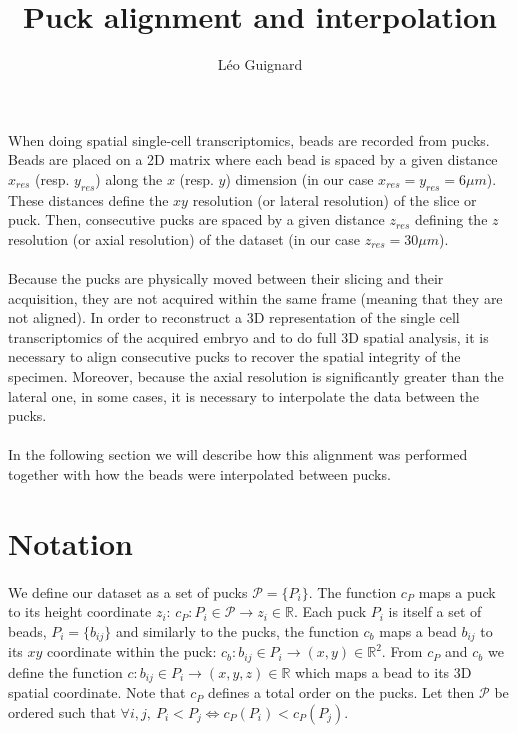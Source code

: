 \documentclass[10pt,a4paper]{article}
\author{L\'eo Guignard}
\title{Puck alignment and interpolation}
\begin{document}
\maketitle
\paragraph{}When doing spatial single-cell transcriptomics, beads are recorded from pucks.
Beads are placed on a 2D matrix where each bead is spaced by a given distance $x_{res}$ (resp.
$y_{res}$) along the $x$ (resp.
$y$) dimension (in our case $x_{res}=y_{res}=6 \mu m$).
These distances define the $xy$ resolution (or lateral resolution) of the slice or puck.
Then, consecutive pucks are spaced by a given distance $z_{res}$ defining the $z$ resolution (or axial resolution) of the dataset (in our case $z_{res}=30\mu m$).
\paragraph{}Because the pucks are physically moved between their slicing and their acquisition, they are not acquired within the same frame (meaning that they are not aligned).
In order to reconstruct a 3D representation of the single cell transcriptomics of the acquired embryo and to do full 3D spatial analysis, it is necessary to align consecutive pucks to recover the spatial integrity of the specimen.
Moreover, because the axial resolution is significantly greater than the lateral one, in some cases, it is necessary to interpolate the data between the pucks.
\paragraph{}In the following section we will describe how this alignment was performed together with how the beads were interpolated between pucks.
\section{Notation}
\paragraph{}We define our dataset as a set of pucks \(\mathcal{P}=\{P_i\}\).
The function $c_P$ maps a puck to its height coordinate $z_i$: \(c_P: P_i\in \mathcal{P} \rightarrow z_i \in \mathbb{R}\).
Each puck $P_i$ is itself a set of beads, \(P_i=\{b_{ij}\}\) and similarly to the pucks, the function \(c_b\) maps a bead \(b_{ij}\) to its \(xy\) coordinate within the puck: \(c_b:b_{ij}\in P_i\rightarrow (x,y)\in \mathbb{R}^2\).
From \(c_P\) and \(c_b\) we define the function \(c:b_{ij}\in P_i\rightarrow (x,y,z)\in\mathbb{R}\) which maps a bead to its 3D spatial coordinate.
Note that \(c_P\) defines a total order on the pucks.
Let then \(\mathcal{P}\) be ordered such that \(\forall i,j,~P_i<P_j\iff c_P(P_i)<c_P(P_j)\).
\end{document}
